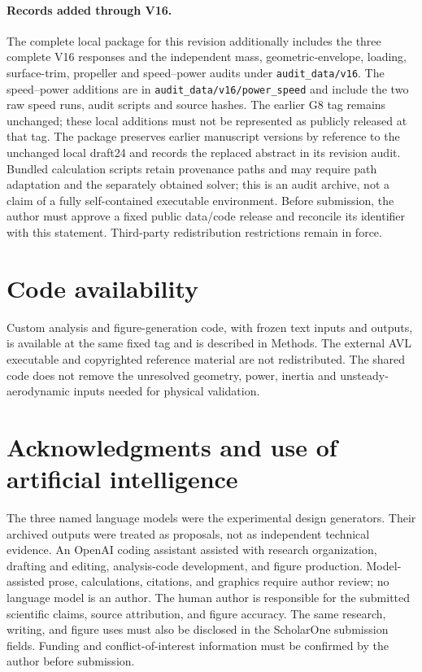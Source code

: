\documentclass[10pt,letterpaper]{article}
\begin{document}
\paragraph{Records added through V16.}
The complete local package for this revision additionally includes the three
complete V16 responses and the independent mass, geometric-envelope, loading,
surface-trim, propeller and speed--power audits under \texttt{audit\_data/v16}.
The speed--power additions are in \texttt{audit\_data/v16/power\_speed} and include
the two raw speed runs, audit scripts and source hashes. The earlier G8 tag remains
unchanged; these local additions must not be represented as publicly released at
that tag. The package preserves earlier manuscript versions by reference to the
unchanged local draft24 and records the replaced abstract in its revision audit.
Bundled calculation scripts retain provenance paths and may require path adaptation
and the separately obtained solver; this is an audit archive, not a claim of a
fully self-contained executable environment. Before submission, the author must
approve a fixed public data/code release and reconcile its identifier with this
statement. Third-party redistribution restrictions remain in force.

\section*{Code availability}
Custom analysis and figure-generation code, with frozen text inputs and outputs, is available at the same fixed tag and is described in Methods. The external AVL executable and copyrighted reference material are not redistributed. The shared code does not remove the unresolved geometry, power, inertia and unsteady-aerodynamic inputs needed for physical validation.

\section*{Acknowledgments and use of artificial intelligence}
The three named language models were the experimental design generators. Their
archived outputs were treated as proposals, not as independent technical
evidence. An OpenAI coding assistant assisted with research organization,
drafting and editing, analysis-code development, and figure production.
Model-assisted prose, calculations, citations, and graphics require author
review; no language model is an author. The human author is responsible for
the submitted scientific claims, source attribution, and figure accuracy.
The same research, writing, and figure uses must also be disclosed in the
ScholarOne submission fields. Funding and conflict-of-interest information
must be confirmed by the author before submission.
\end{document}
